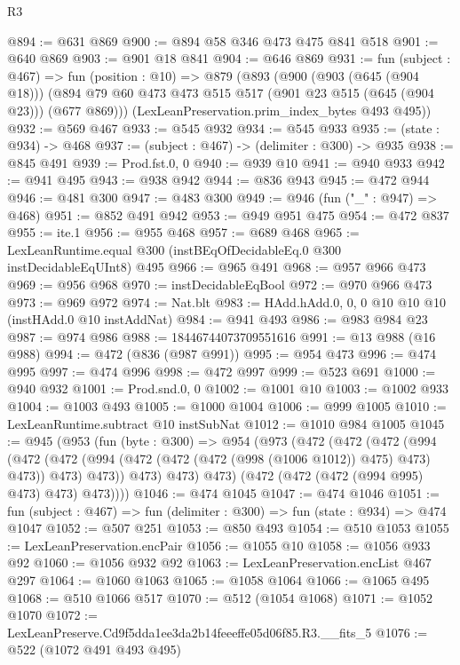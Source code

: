 \begin{lexlean}{R3}
\begin{coremodule}
@894 := @631 @869
@900 := @894 @58 @346 @473 @475 @841 @518
@901 := @640 @869
@903 := @901 @18 @841
@904 := @646 @869
@931 := fun (subject : @467) =>
  fun (position : @10) =>
  @879
    (@893
      (@900
        (@903 (@645 (@904 @18)))
        (@894 @79 @60 @473 @473 @515 @517 (@901 @23 @515 (@645 (@904 @23))) (@677 @869)))
      (LexLeanPreservation.prim_index_bytes @493 @495))
@932 := @569 @467
@933 := @545 @932
@934 := @545 @933
@935 := (state : @934) -> @468
@937 := (subject : @467) -> (delimiter : @300) -> @935
@938 := @845 @491
@939 := Prod.fst.{0, 0}
@940 := @939 @10
@941 := @940 @933
@942 := @941 @495
@943 := @938 @942
@944 := @836 @943
@945 := @472 @944
@946 := @481 @300
@947 := @483 @300
@949 := @946 (fun ("_" : @947) => @468)
@951 := @852 @491 @942
@953 := @949 @951 @475
@954 := @472 @837
@955 := ite.{1}
@956 := @955 @468
@957 := @689 @468
@965 := LexLeanRuntime.equal @300 (instBEqOfDecidableEq.{0} @300 instDecidableEqUInt8) @495
@966 := @965 @491
@968 := @957 @966 @473
@969 := @956 @968
@970 := instDecidableEqBool
@972 := @970 @966 @473
@973 := @969 @972
@974 := Nat.blt
@983 := HAdd.hAdd.{0, 0, 0} @10 @10 @10 (instHAdd.{0} @10 instAddNat)
@984 := @941 @493
@986 := @983 @984 @23
@987 := @974 @986
@988 := 18446744073709551616
@991 := @13 @988 (@16 @988)
@994 := @472 (@836 (@987 @991))
@995 := @954 @473
@996 := @474 @995
@997 := @474 @996
@998 := @472 @997
@999 := @523 @691
@1000 := @940 @932
@1001 := Prod.snd.{0, 0}
@1002 := @1001 @10
@1003 := @1002 @933
@1004 := @1003 @493
@1005 := @1000 @1004
@1006 := @999 @1005
@1010 := LexLeanRuntime.subtract @10 instSubNat
@1012 := @1010 @984 @1005
@1045 := @945
    (@953
      (fun (byte : @300) =>
      @954
        (@973
          (@472
            (@472
              (@472
                (@994
                  (@472
                    (@472 (@994 (@472 (@472 (@472 (@998 (@1006 @1012)) @475) @473) @473)) @473)
                    @473))
                @473)
              @473)
            @473)
          (@472 (@472 (@472 (@994 @995) @473) @473) @473))))
@1046 := @474 @1045
@1047 := @474 @1046
@1051 := fun (subject : @467) => fun (delimiter : @300) => fun (state : @934) => @474 @1047
@1052 := @507 @251
@1053 := @850 @493
@1054 := @510 @1053
@1055 := LexLeanPreservation.encPair
@1056 := @1055 @10
@1058 := @1056 @933 @92
@1060 := @1056 @932 @92
@1063 := LexLeanPreservation.encList @467 @297
@1064 := @1060 @1063
@1065 := @1058 @1064
@1066 := @1065 @495
@1068 := @510 @1066 @517
@1070 := @512 (@1054 @1068)
@1071 := @1052 @1070
@1072 := LexLeanPreserve.Cd9f5dda1ee3da2b14feeeffe05d06f85.R3.__fits_5
@1076 := @522 (@1072 @491 @493 @495)

\end{coremodule}
\end{lexlean}
